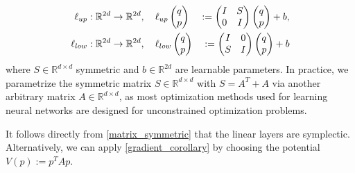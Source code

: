 \documentclass[twoside,a4paper]{article}
\begin{document}
\begin{alignat*}{2}
	\ell_{up}&: \mathbb{R}^{2d} \to \mathbb{R}^{2d}, \quad \ell_{up} \begin{pmatrix} q \\ p \end{pmatrix} &:= \begin{pmatrix}
		I & S \\
		0 & I
	\end{pmatrix} \begin{pmatrix} q \\ p \end{pmatrix} + b, \\
	\ell_{low}&: \mathbb{R}^{2d} \to \mathbb{R}^{2d}, \quad \ell_{low} \begin{pmatrix} q \\ p \end{pmatrix} &:= \begin{pmatrix}
		I & 0 \\
		S & I
	\end{pmatrix} \begin{pmatrix} q \\ p \end{pmatrix} + b
\end{alignat*}
where $S \in \mathbb{R}^{d \times d}$ symmetric and $b \in \mathbb{R}^{2d}$
are learnable parameters. In practice, we parametrize the symmetric matrix $S\in \mathbb{R}^{d \times d}$
with $S = A^T + A$ via another arbitrary matrix $A\in \mathbb{R}^{d \times d}$, as
most optimization methods used for learning neural networks are designed for
unconstrained optimization problems.

It follows directly from \cref{matrix_symmetric} that the linear layers are
symplectic. Alternatively, we can apply \cref{gradient_corollary} by
choosing the potential $V(p) := p^TAp$.
\end{document}
